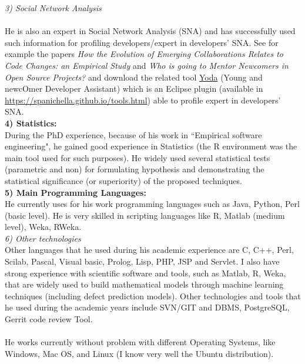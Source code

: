 \documentclass[10pt]{article}
\begin{document}
\textit{3) Social Network Analysis }\\\\

He is also an expert in Social Network Analysis (SNA) and has successfully used such information for profiling developers/expert in developers' SNA.  See  for example the papers  \textit{How the Evolution of Emerging Collaborations Relates to Code Changes: an Empirical Study} and \textit{Who is going to Mentor Newcomers in Open Source Projects?} and download the related tool \href{https://spanichella.github.io/tools.html}{Yoda} (Young and newcOmer Developer Assistant) which is an Eclipse plugin (available in \href{https://spanichella.github.io/tools.html}{https://spanichella.github.io/tools.html}) able to profile expert in developers' SNA.\\

\textbf{4) Statistics:}\\
During the PhD experience,  because of his work in ``Empirical software engineering",
he gained good experience in Statistics (the R environment was the main tool used for such purposes).
He widely used several statistical tests (parametric and non) for formulating hypothesis
and demonstrating the statistical significance (or superiority) of the proposed techniques.\\


\textbf{5) Main Programming Languages:}\\
He currently uses for his work programming languages such as Java, Python, Perl (basic level). He is very skilled in scripting languages like R, Matlab (medium level), Weka, RWeka.\\

\textit{6) Other technologies}\\

Other languages that he used during his academic experience are C, C++, Perl, Scilab, 
Pascal, Visual basic, Prolog, Lisp, PHP,  JSP and Servlet. I also have strong experience with scientific software
and tools, such as Matlab, R, Weka, that are widely used to build 
mathematical models through machine learning techniques (including 
defect prediction models). Other technologies and tools that he used
during the academic years include SVN/GIT and DBMS, PostgreSQL, Gerrit
 code review Tool. \\\\
 
He works currently without problem with different  Operating Systems, like Windows, Mac OS, and Linux (I know very 
well the Ubuntu distribution). \\\\
\end{document}
